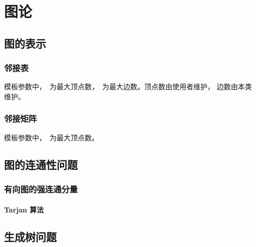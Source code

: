 \chapter{图论}


\section{图的表示}

\subsection{邻接表}

模板参数中，~为最大顶点数，~为最大边数。顶点数由使用者维护，
边数由本类维护。



\subsection{邻接矩阵}

模板参数中，~为最大顶点数。




\section{图的连通性问题}

\subsection{有向图的强连通分量}

\subsubsection{Tarjan 算法}




\section{生成树问题}

